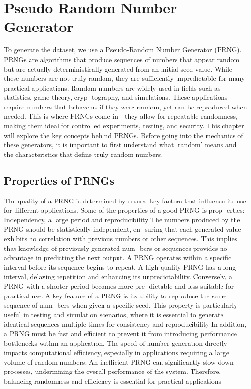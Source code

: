 	\section{Pseudo Random Number Generator}
	
	To generate the dataset, we use a Pseudo-Random Number Generator (PRNG).
	PRNGs are algorithms that produce sequences of numbers that appear random
	but are actually deterministically generated from an initial seed value. While
	these numbers are not truly random, they are sufficiently unpredictable for many
	practical applications.
	Random numbers are widely used in fields such as statistics, game theory, cryp-
	tography, and simulations. These applications require numbers that behave
	as if they were random, yet can be reproduced when needed. This is where
	PRNGs come in—they allow for repeatable randomness, making them ideal for
	controlled experiments, testing, and security.
	This chapter will explore the key concepts behind PRNGs. Before going into the
	mechanics of these generators, it is important to first understand what ’random’
	means and the characteristics that define truly random numbers.
	
	\subsection{Properties of PRNGs}
	
The quality of a PRNG is determined by several key factors that influence its
use for different applications. Some of the properties of a good PRNG is prop-
erties: Independency, a large period and reproducibility
The numbers produced by the PRNG should be statistically independent, en-
suring that each generated value exhibits no correlation with previous numbers
or other sequences. This implies that knowledge of previously generated num-
bers or sequences provides no advantage in predicting the next output.
A PRNG operates within a specific interval before its sequence begins to repeat.
A high-quality PRNG has a long interval, delaying repetition and enhancing its
unpredictability. Conversely, a PRNG with a shorter period becomes more pre-
dictable and less suitable for practical use.
A key feature of a PRNG is its ability to reproduce the same sequence of num-
bers when given a specific seed. This property is particularly useful in testing
and simulation scenarios, where it is essential to generate identical sequences
multiple times for consistency and reproducibility
In addition, a PRNG must be fast and efficient to prevent it from introducing
performance bottlenecks within an application. The speed of number generation
directly impacts computational efficiency, especially in applications requiring a
large volume of random numbers. An inefficient PRNG can significantly slow
down processes, undermining the overall performance of the system. Therefore,
balancing randomness and efficiency is essential for practical applications
	
